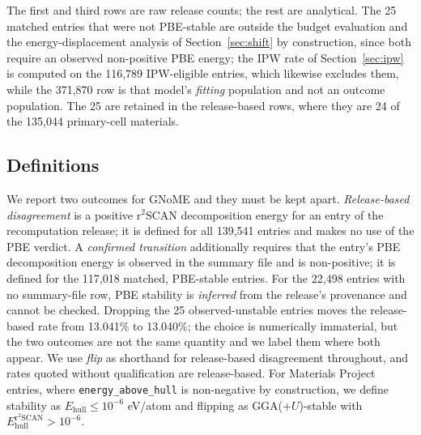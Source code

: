 \documentclass[11pt]{article}
\begin{document}
The first and third rows are raw release counts; the rest are analytical. The 25 matched
entries that were not PBE-stable are outside the budget evaluation and the
energy-displacement analysis of Section~\ref{sec:shift} by construction, since both
require an observed non-positive PBE energy; the IPW rate of
Section~\ref{sec:ipw} is computed on the 116{,}789 IPW-eligible entries, which likewise
excludes them, while the 371{,}870 row is that model's \emph{fitting} population and not
an outcome population. The 25 are retained in the release-based rows, where they are 24
of the 135{,}044 primary-cell materials.

\subsection{Definitions}\label{sec:defs}

We report two outcomes for GNoME and they must be kept apart. \emph{Release-based
disagreement} is a positive r$^2$SCAN decomposition energy for an entry of the
recomputation release; it is defined for all 139{,}541 entries and makes no use of the PBE
verdict. A \emph{confirmed transition} additionally requires that the entry's PBE
decomposition energy is observed in the summary file and is non-positive; it is defined
for the 117{,}018 matched, PBE-stable entries. For the 22{,}498 entries with no summary-file row, PBE stability is \emph{inferred}
from the release's provenance and cannot be checked. Dropping the 25 observed-unstable
entries moves the release-based rate from 13.041\% to 13.040\%; the choice is
numerically immaterial, but the two outcomes are not the same quantity and we label
them where both appear. We use \emph{flip} as shorthand for release-based disagreement throughout, and
rates quoted without qualification are release-based. For Materials Project entries,
where \texttt{energy\_above\_hull} is non-negative by construction, we define stability as
$E_{\text{hull}} \le 10^{-6}$ eV/atom and flipping as GGA(+$U$)-stable with
$E_{\text{hull}}^{\text{r}^2\text{SCAN}} > 10^{-6}$.
\end{document}
